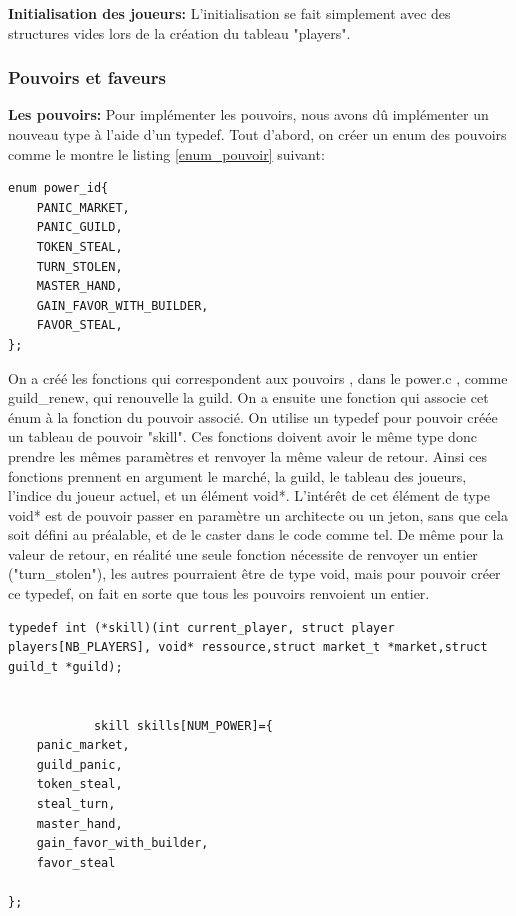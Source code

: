 \documentclass{article}
\begin{document}
        \textbf{Initialisation des joueurs:} L'initialisation se fait simplement avec des structures vides lors de la création du tableau "players".

        
        \subsubsection{Pouvoirs et faveurs}
            \textbf{Les pouvoirs:} Pour implémenter les pouvoirs, nous avons dû implémenter un nouveau type à l'aide d'un typedef. Tout d'abord, on créer un enum des pouvoirs comme le montre le listing \ref{enum_pouvoir} suivant:

             \begin{lstlisting}[frame=single, caption={Enum des pouvoirs },label=enum_pouvoir]
            enum power_id{
    PANIC_MARKET,
    PANIC_GUILD,
    TOKEN_STEAL,
    TURN_STOLEN,
    MASTER_HAND,
	GAIN_FAVOR_WITH_BUILDER,
	FAVOR_STEAL,
};
    \end{lstlisting}
    
    On a créé les fonctions qui correspondent aux pouvoirs , dans le power.c , comme guild\_renew, qui renouvelle la guild.
On a ensuite une fonction qui associe cet énum à la fonction du pouvoir associé. On utilise un typedef pour pouvoir créée un tableau de pouvoir "skill". Ces fonctions doivent avoir le même type donc prendre les mêmes paramètres et renvoyer la même valeur de retour. Ainsi ces fonctions prennent en argument le marché, la guild, le tableau des joueurs, l'indice du joueur actuel, et un élément void*. L'intérêt de cet élément de type void* est de pouvoir passer en paramètre un architecte ou un jeton, sans que cela soit défini au préalable, et de le caster dans le code comme tel. De même pour la valeur de retour, en réalité une seule fonction nécessite de renvoyer un entier ("turn\_stolen"), les autres pourraient être de type void, mais pour pouvoir créer ce typedef, on fait en sorte que tous les pouvoirs renvoient un entier.
\begin{lstlisting}[frame=single, caption={Implementation des pouvoirs },label=implementation_pouvoir]
            typedef int (*skill)(int current_player, struct player players[NB_PLAYERS], void* ressource,struct market_t *market,struct guild_t *guild);


            skill skills[NUM_POWER]={
	panic_market,
	guild_panic,
	token_steal,
	steal_turn,
	master_hand,
	gain_favor_with_builder,
	favor_steal
	
};
    \end{lstlisting}
\end{document}
